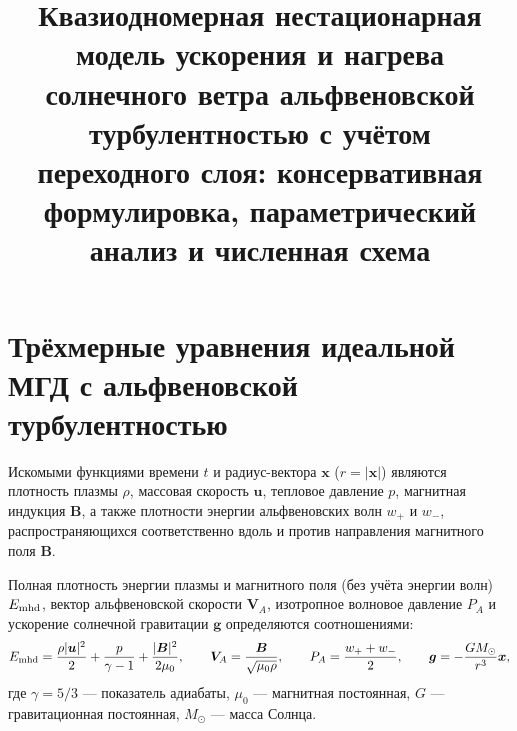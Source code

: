 \documentclass[11pt,a4paper]{article}
\title{\textbf{Квазиодномерная нестационарная модель ускорения и нагрева солнечного ветра альфвеновской турбулентностью с учётом переходного слоя: консервативная формулировка, параметрический анализ и численная схема}}
\author{}
\date{}
\begin{document}
\maketitle

\section{Трёхмерные уравнения идеальной МГД с альфвеновской турбулентностью}

Искомыми функциями времени $t$ и радиус-вектора $\bm{x}$ ($r = |\bm{x}|$) являются плотность плазмы $\rho$, массовая скорость $\bm{u}$, тепловое давление $p$, магнитная индукция $\bm{B}$, а также плотности энергии альфвеновских волн $w_+$ и $w_-$, распространяющихся соответственно вдоль и против направления магнитного поля $\bm{B}$.

Полная плотность энергии плазмы и магнитного поля (без учёта энергии волн) $E_{\rm mhd}$, вектор альфвеновской скорости $\bm{V}_A$, изотропное волновое давление $P_A$ и ускорение солнечной гравитации $\bm{g}$ определяются соотношениями:
\begin{equation}
E_{\rm mhd} = \frac{\rho|\bm{u}|^2}{2} + \frac{p}{\gamma-1} + \frac{|\bm{B}|^2}{2\mu_0}, \qquad
\bm{V}_A = \frac{\bm{B}}{\sqrt{\mu_0\rho}}, \qquad
P_A = \frac{w_+ + w_-}{2}, \qquad
\bm{g} = -\frac{GM_\odot}{r^3}\bm{x},
\label{eq:defs_3d}
\end{equation}
где $\gamma = 5/3$ --- показатель адиабаты, $\mu_0$ --- магнитная постоянная, $G$ --- гравитационная постоянная, $M_\odot$ --- масса Солнца.
\end{document}

